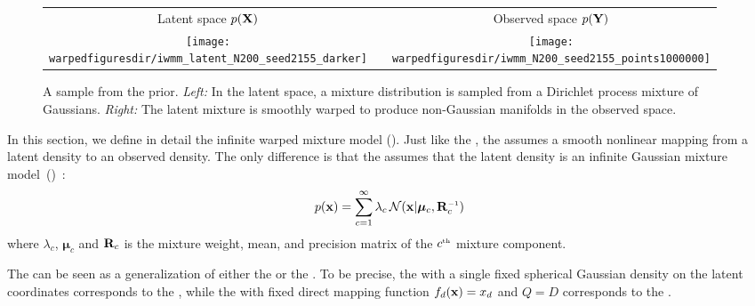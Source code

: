 \begin{figure}
\centering
\begin{tabular}{ccc}
Latent space $p(\mathbf{X})$ & & Observed space $p(\mathbf{Y})$ \\
\fbox{\texttt{[image: \\warpedfiguresdir/iwmm\_latent\_N200\_seed2155\_darker]}} &
\raisebox{7em}{$\overset{\mathlarger{\vf(\vx)}}{\mathlarger{\mathlarger{\mathlarger{\mathlarger{\mathlarger{\mathlarger{\mathlarger{\rightarrow}}}}}}}}$} &
\fbox{\texttt{[image: \\warpedfiguresdir/iwmm\_N200\_seed2155\_points1000000]}}
\end{tabular}
\caption[A draw from the infinite warped mixture model prior]{
A sample from the \iwmm{} prior.
\emph{Left:} In the latent space, a mixture distribution is sampled from a Dirichlet process mixture of Gaussians.
\emph{Right:} The latent mixture is smoothly warped to produce non-Gaussian manifolds in the observed space.}
\label{fig:generative}
\end{figure}


In this section, we define in detail the infinite warped mixture model (\iwmm{}).
Just like the \gplvm{}, the \iwmm{} assumes a smooth nonlinear mapping from a latent density to an observed density.
The only difference is that the \iwmm{} assumes that the latent density is an infinite Gaussian mixture model~(\iGMM{})~\citep{rasmussen2000infinite}:
\begin{align}
p(\vx ) = \sum_{c=1}^{\infty} \lambda_c \, {\cal N}(\vx|\bm{\mu}_{c},\vR_{c}\inv)
\end{align}
where $\lambda_{c}$, $\bm{\mu}_{c}$ and $\mathbf{R}_{c}$ is the mixture weight, mean, and precision matrix of the $c^{\text{\tiny th}}$ mixture component.

The \iwmm{} can be seen as a generalization of either the \gplvm{} or the \iGMM{}.
To be precise, the \iwmm{} with a single fixed spherical Gaussian density on the latent coordinates corresponds to the \gplvm{}, while the \iwmm{} with fixed direct mapping function $f_{d}({\bf{x}})=x_{d}$ and 
$Q=D$ corresponds to the \iGMM{}.

